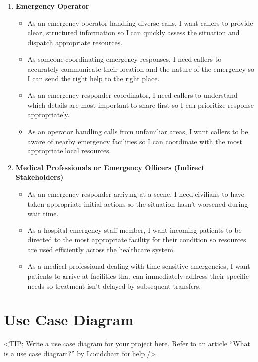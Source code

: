 \begin{enumerate}
    \item \textbf{Emergency Operator}
    \begin{itemize}
        \item As an emergency operator handling diverse calls, I want callers to provide clear, structured information so I can quickly assess the situation and dispatch appropriate resources.
        \item As someone coordinating emergency responses, I need callers to accurately communicate their location and the nature of the emergency so I can send the right help to the right place.
        \item As an emergency responder coordinator, I need callers to understand which details are most important to share first so I can prioritize response appropriately.
        \item As an operator handling calls from unfamiliar areas, I want callers to be aware of nearby emergency facilities so I can coordinate with the most appropriate local resources.
    \end{itemize}

    \item \textbf{Medical Professionals or Emergency Officers (Indirect Stakeholders)}
    \begin{itemize}
        \item As an emergency responder arriving at a scene, I need civilians to have taken appropriate initial actions so the situation hasn't worsened during wait time.
        \item As a hospital emergency staff member, I want incoming patients to be directed to the most appropriate facility for their condition so resources are used efficiently across the healthcare system.
        \item As a medical professional dealing with time-sensitive emergencies, I want patients to arrive at facilities that can immediately address their specific needs so treatment isn't delayed by subsequent transfers.

    \end{itemize}

\end{enumerate}

\section{Use Case Diagram}
\label{section:use-case-diagram}
<TIP: Write a use case diagram for your project here. Refer to an
article “What is a use case diagram?” by Lucidchart for help./>

